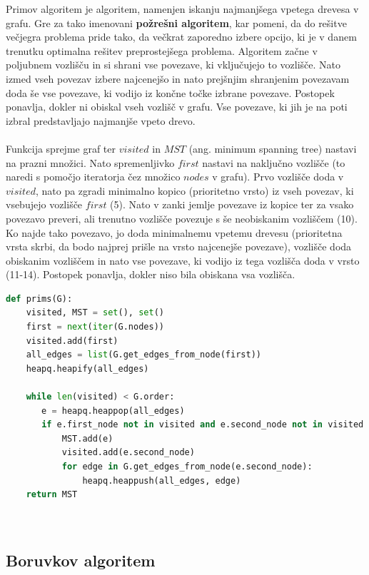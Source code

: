 \documentclass[11pt]{article}
\begin{document}
Primov algoritem je algoritem, namenjen iskanju najmanjšega vpetega drevesa v grafu. Gre za tako imenovani \textbf{požrešni algoritem}, kar pomeni, da do rešitve večjegra problema pride tako, da večkrat zaporedno izbere opcijo, ki je v danem trenutku optimalna rešitev preprostejšega problema. Algoritem začne v poljubnem vozlišču in si shrani vse povezave, ki vključujejo to vozlišče. Nato izmed vseh povezav izbere najcenejšo in nato prejšnjim shranjenim povezavam doda še vse povezave, ki vodijo iz končne točke izbrane povezave. Postopek ponavlja, dokler ni obiskal vseh vozlišč v grafu. Vse povezave, ki jih je na poti izbral predstavljajo najmanjše vpeto drevo.
\\ \\
Funkcija sprejme graf ter $visited$ in $MST$ (ang. minimum spanning tree) nastavi na prazni množici. Nato spremenljivko $first$ nastavi na naključno vozlišče (to naredi s pomočjo iteratorja čez množico $nodes$ v grafu). Prvo vozlišče doda v $visited$, nato pa zgradi minimalno kopico (prioritetno vrsto) iz vseh povezav, ki vsebujejo vozlišče $first$ (5). Nato v zanki jemlje povezave iz kopice ter za vsako povezavo preveri, ali trenutno vozlišče povezuje s še neobiskanim vozliščem (10). Ko najde tako povezavo, jo doda minimalnemu vpetemu drevesu (prioritetna vrsta skrbi, da bodo najprej prišle na vrsto najcenejše povezave), vozlišče doda obiskanim vozliščem in nato vse povezave, ki vodijo iz tega vozlišča doda v vrsto (11-14). Postopek ponavlja, dokler niso bila obiskana vsa vozlišča. \cite{prims}

\begin{lstlisting}[language=Python, caption=Primov algoritem]
def prims(G):
    visited, MST = set(), set()
    first = next(iter(G.nodes))
    visited.add(first)
    all_edges = list(G.get_edges_from_node(first))
    heapq.heapify(all_edges)
    
    while len(visited) < G.order:
       e = heapq.heappop(all_edges)
       if e.first_node not in visited and e.second_node not in visited:
           MST.add(e)
           visited.add(e.second_node)
           for edge in G.get_edges_from_node(e.second_node):
               heapq.heappush(all_edges, edge)
    return MST
        
    
\end{lstlisting}


\subsection{Boruvkov algoritem}
\end{document}
